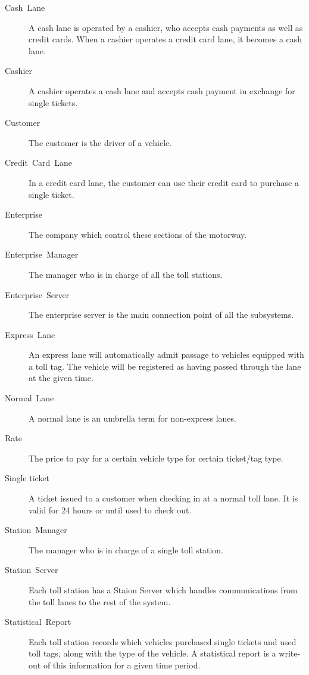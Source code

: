 \begin{description}
\item [{Cash~Lane}] A cash lane is operated by a cashier, who accepts cash
payments as well as credit cards. When a cashier operates a credit card
lane, it becomes a cash lane.

\item [{Cashier}] A cashier operates a cash lane and accepts cash payment
in exchange for single tickets.

\item [{Customer}] The customer is the driver of a vehicle.

\item [{Credit~Card~Lane}] In a credit card lane, the customer can use their
credit card to purchase a single ticket.

\item [{Enterprise}] The company which control these sections of the motorway.

\item [{Enterprise~Manager}] The manager who is in charge of all the toll stations.

\item [{Enterprise~Server}] The enterprise server is the main connection point of all the subsystems.

\item [{Express~Lane}] An express lane will automatically admit passage
to vehicles equipped with a toll tag. The vehicle will be registered
as having passed through the lane at the given time.

\item [{Normal~Lane}] A normal lane is an umbrella term for non-express lanes.

\item [{Rate}] The price to pay for a certain vehicle type for certain ticket/tag type.

\item [{Single ticket}] A ticket issued to a customer when checking in at a normal toll lane. It is valid for 24 hours or until used to check out.

\item [{Station~Manager}] The manager who is in charge of a single toll station.

\item [{Station~Server}] Each toll station has a Staion Server which handles communications from the toll lanes to the rest of the system.

\item [{Statistical~Report}] Each toll station records which vehicles
purchased single tickets and used toll tags, along with the type of
the vehicle. A statistical report is a write-out of this information
for a given time period.






\end{description}
